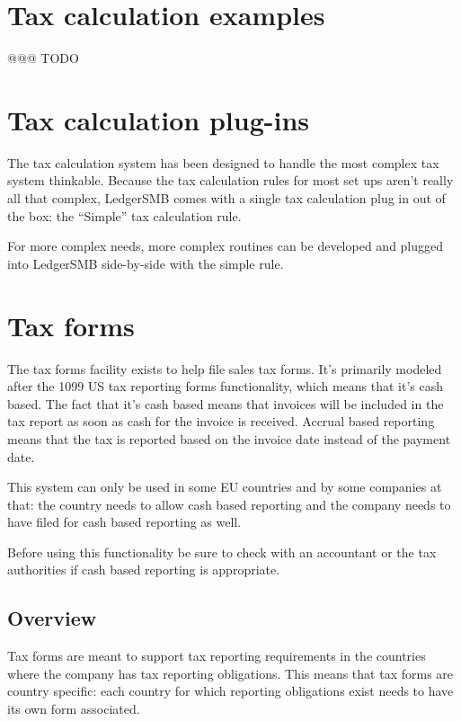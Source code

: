 \section{Tax calculation examples}
\label{sec-tax-calculation-examples}

@@@ TODO

\section{Tax calculation plug-ins}
\label{sec-tax-rule-plugins}

The tax calculation system has been designed to handle the most complex tax system
thinkable. Because the tax calculation rules for most set ups aren't really all that
complex, LedgerSMB comes with a single tax calculation plug in out of the box: the
``Simple'' tax calculation rule.

For more complex needs, more complex routines can be developed and plugged into
LedgerSMB side-by-side with the simple rule.


\section{Tax forms}
\label{sec-tax-taxforms}

The tax forms facility exists to help file sales tax forms. It's primarily modeled
after the 1099 US tax reporting forms functionality, which means that it's cash based.
The fact that it's cash based means that invoices will be included in the tax report
as soon as cash for the invoice is received. Accrual based reporting means that the
tax is reported based on the invoice date instead of the payment date.

This system can only be used in some EU countries and by some companies at that: the
country needs to allow cash based reporting and the company needs to have filed
for cash based reporting as well.

Before using this functionality be sure to check with an accountant or the tax
authorities if cash based reporting is appropriate.

\subsection{Overview}
\label{subsec-tax-taxforms-overview}

Tax forms are meant to support tax reporting requirements in the countries
where the company has tax reporting obligations. This means that tax forms
are country specific: each country for which reporting obligations exist
needs to have its own form associated.

